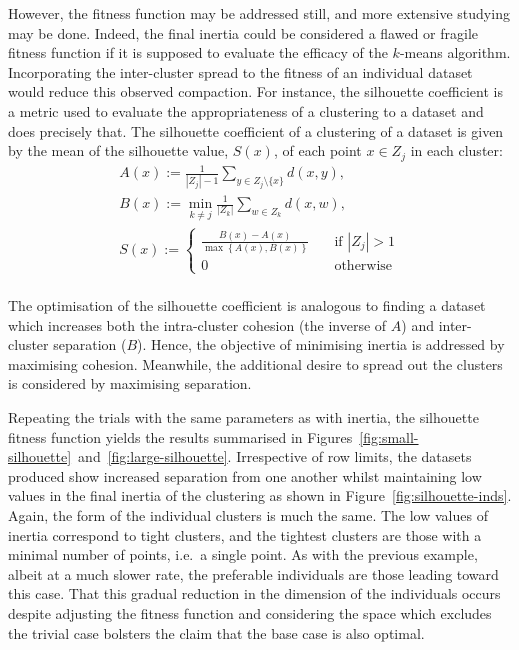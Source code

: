 However, the fitness function may be addressed still, and more extensive
studying may be done. Indeed, the final inertia could be considered a flawed or
fragile fitness function if it is supposed to evaluate the efficacy of the
\(k\)-means algorithm. Incorporating the inter-cluster spread to the fitness
of an individual dataset would reduce this observed compaction. For instance,
the silhouette coefficient is a metric used to evaluate the appropriateness of a
clustering to a dataset and does precisely that. The silhouette coefficient of a
clustering of a dataset is given by the mean of the silhouette value,
\(S(x)\), of each point \(x \in Z_j\) in each cluster:
\begin{equation}
    \begin{gathered}
        A(x) := \frac{1}{|Z_j| - 1} \sum_{y \in Z_j \setminus \{x\}} d(x, y),
        \\
        B(x) := \min_{k \neq j} \frac{1}{|Z_k|} \sum_{w \in Z_k} d(x, w),
        \\
        S(x) :=
            \begin{cases}
                \frac{B(x) - A(x)}{\max\left\{A(x), B(x)\right\}}
                &\quad \text{if } |Z_j| > 1\\
                0 &\quad \text{otherwise}
            \end{cases}
    \end{gathered}\label{eq:silhouette}
\end{equation}\\

The optimisation of the silhouette coefficient is analogous to finding a dataset
which increases both the intra-cluster cohesion (the inverse of \(A\)) and
inter-cluster separation (\(B\)). Hence, the objective of minimising inertia is
addressed by maximising cohesion. Meanwhile, the additional desire to spread out
the clusters is considered by maximising separation.

Repeating the trials with the same parameters as with inertia, the silhouette
fitness function yields the results summarised in
Figures~\ref{fig:small-silhouette}~and~\ref{fig:large-silhouette}. Irrespective
of row limits, the datasets produced show increased separation from one another
whilst maintaining low values in the final inertia of the clustering as shown in
Figure~\ref{fig:silhouette-inds}. Again, the form of the individual clusters is
much the same. The low values of inertia correspond to tight clusters, and the
tightest clusters are those with a minimal number of points, i.e.\ a single
point. As with the previous example, albeit at a much slower rate, the
preferable individuals are those leading toward this case. That this gradual
reduction in the dimension of the individuals occurs despite adjusting the
fitness function and considering the space which excludes the trivial case
bolsters the claim that the base case is also optimal.

